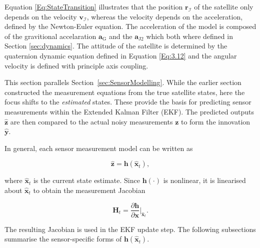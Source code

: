 \noindent
Equation \ref{Eq:StateTransition} illustrates that the position $\mathbf{r}_\mathcal{I}$ of the satellite only depends on the velocity $\mathbf{v}_\mathcal{I}$, whereas
the velocity depends on the acceleration, defined by the Newton-Euler equation. The acceleration of the model is composed of the gravitional accelaration $\mathbf{a}_\text{G}$ and the
$\mathbf{a}_{\text{J2}}$ which both where defined in Section \ref{sec:dynamics}. The attitude of the satellite is determined by the quaternion dynamic equation defined in Equation \ref{Eq:3.12}
and the angular velocity is defined with principle axis coupling.


This section parallels Section~\ref{sec:SensorModelling}. While the earlier section constructed the measurement equations 
from the true satellite states, here the focus shifts to the \emph{estimated} states. These provide the basis for predicting 
sensor measurements within the Extended Kalman Filter (EKF). The predicted outputs $\hat{\mathbf{z}}$ are then compared to 
the actual noisy measurements $\mathbf{z}$ to form the innovation $\mathbf{\hat{y}}$.
\vspace{0.5cm}

\noindent
In general, each sensor measurement model can be written as

\begin{equation}
    \hat{\mathbf{z}} = \mathbf{h}(\hat{\mathbf{x}}_t),
\end{equation}

\noindent
where $\hat{\mathbf{x}}_t$ is the current state estimate. Since $\mathbf{h}(\cdot)$ is nonlinear, it is linearised about 
$\hat{\mathbf{x}}_t$ to obtain the measurement Jacobian

\begin{equation}
    \mathbf{H}_t = \frac{\partial \mathbf{h}}{\partial \mathbf{x}} \Big|_{\hat{\mathbf{x}}_t}.
\end{equation}

\noindent
The resulting Jacobian is used in the EKF update step. The following subsections summarise the sensor-specific forms of 
$\mathbf{h}(\hat{\mathbf{x}}_t)$.


